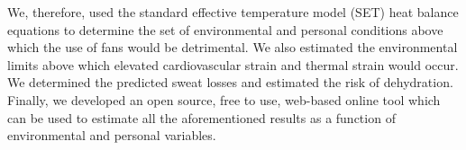 \begin{itemize}
    We, therefore, used the standard effective temperature model (SET) heat balance equations to determine the set of environmental and personal conditions above which the use of fans would be detrimental.
    We also estimated the environmental limits above which elevated cardiovascular strain and thermal strain would occur.
    We determined the predicted sweat losses and estimated the risk of dehydration.
    Finally, we developed an open source, free to use, web-based online tool which can be used to estimate all the aforementioned results as a function of environmental and personal variables.
\end{itemize}





